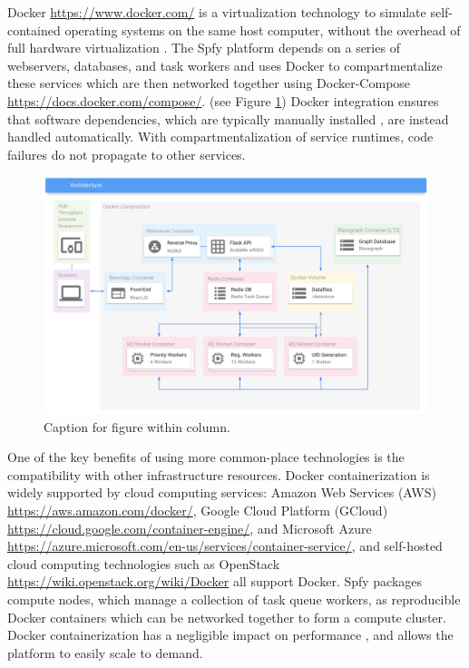\documentclass{article}
\begin{document}
Docker \url{https://www.docker.com/} is a virtualization technology to simulate self-contained operating systems on the same host computer, without the overhead of full hardware virtualization \cite{felter2015updated}.
The Spfy platform depends on a series of webservers, databases, and task workers and uses Docker to compartmentalize these services which are then networked together using Docker-Compose \url{https://docs.docker.com/compose/}.
(see Figure \ref{fig-docker})
Docker integration ensures that software dependencies, which are typically manually installed \cite{doi:10.1093/bioinformatics/btu153,laing2010pan,inouye2014srst2,naccache2014cloud}, are instead handled automatically. With compartmentalization of service runtimes, code failures do not propagate to other services.

\begin{figure}[!hb]
\begin{center}
\includegraphics[width=\textwidth]{images/docker}
\end{center}
\caption{Caption for figure within column.}
\label{fig-docker}
\end{figure}

One of the key benefits of using more common-place technologies is the compatibility with other infrastructure resources.
Docker containerization is widely supported by cloud computing services: Amazon Web Services (AWS) \url{https://aws.amazon.com/docker/}, Google Cloud Platform (GCloud) \url{https://cloud.google.com/container-engine/}, and Microsoft Azure \url{https://azure.microsoft.com/en-us/services/container-service/}, and self-hosted cloud computing technologies such as OpenStack \url{https://wiki.openstack.org/wiki/Docker} all support Docker.
Spfy packages compute nodes, which manage a collection of task queue workers, as reproducible Docker containers which can be networked together to form a compute cluster.
Docker containerization has a negligible impact on performance \cite{di2015impact}, and allows the platform to easily scale to demand.
\end{document}
